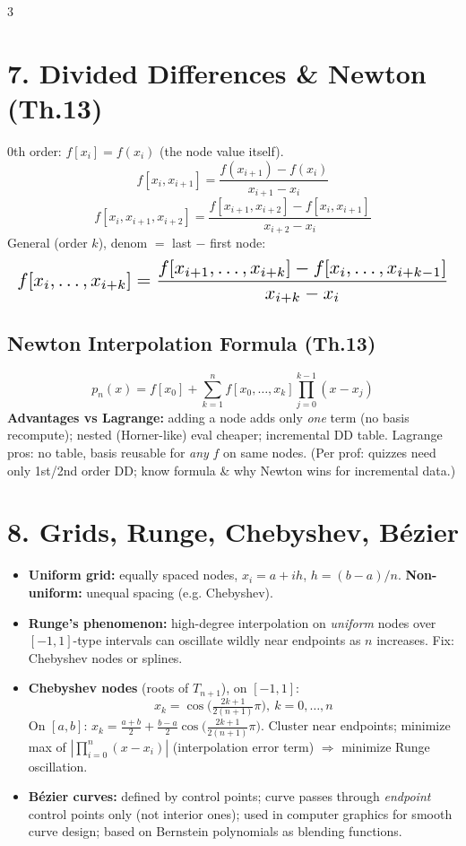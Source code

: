 \documentclass[9pt]{extarticle}
\newcommand{\hl}[1]{\textbf{\textcolor{BrickRed}{#1}}}
\begin{document}
\begin{multicols}{3}
\section{7. Divided Differences \& Newton (Th.13)}
0th order: $f[x_i]=f(x_i)$ (the node value itself).
\begin{equation*}
f[x_i,x_{i+1}]=\frac{f(x_{i+1})-f(x_i)}{x_{i+1}-x_i}
\end{equation*}
\begin{equation*}
f[x_i,x_{i+1},x_{i+2}]=\frac{f[x_{i+1},x_{i+2}]-f[x_i,x_{i+1}]}{x_{i+2}-x_i}
\end{equation*}
General (order $k$), denom $=$ last $-$ first node:
\begin{equation*}
\resizebox{\linewidth}{!}{$f[x_i,\dots,x_{i+k}]=\dfrac{f[x_{i+1},\dots,x_{i+k}]-f[x_i,\dots,x_{i+k-1}]}{x_{i+k}-x_i}$}
\end{equation*}

\subsection{Newton Interpolation Formula (Th.13)}
\begin{equation*}
p_n(x)=f[x_0]+\sum_{k=1}^{n} f[x_0,\dots,x_k]\prod_{j=0}^{k-1}(x-x_j)
\end{equation*}
\hl{Advantages vs Lagrange:} adding a node adds only \emph{one} term (no basis recompute); nested (Horner-like) eval cheaper; incremental DD table. Lagrange pros: no table, basis reusable for \emph{any} $f$ on same nodes. (Per prof: quizzes need only 1st/2nd order DD; know formula \& why Newton wins for incremental data.)

\section{8. Grids, Runge, Chebyshev, Bézier}
\begin{itemize}
\item \hl{Uniform grid:} equally spaced nodes, $x_i=a+ih$, $h=(b-a)/n$. \hl{Non-uniform:} unequal spacing (e.g. Chebyshev).
\item \hl{Runge's phenomenon:} high-degree interpolation on \emph{uniform} nodes over $[-1,1]$-type intervals can oscillate wildly near endpoints as $n$ increases. Fix: Chebyshev nodes or splines.
\item \hl{Chebyshev nodes} (roots of $T_{n+1}$), on $[-1,1]$:
\begin{equation*}
x_k=\cos\!\Big(\tfrac{2k+1}{2(n+1)}\pi\Big),\ k=0,\dots,n
\end{equation*}
On $[a,b]$: $x_k=\tfrac{a+b}{2}+\tfrac{b-a}{2}\cos\!\Big(\tfrac{2k+1}{2(n+1)}\pi\Big)$. Cluster near endpoints; minimize max of $|\prod_{i=0}^n(x-x_i)|$ (interpolation error term) $\Rightarrow$ minimize Runge oscillation.
\item \hl{Bézier curves:} defined by control points; curve passes through \emph{endpoint} control points only (not interior ones); used in computer graphics for smooth curve design; based on Bernstein polynomials as blending functions.
\end{itemize}


\end{multicols}
\end{document}
